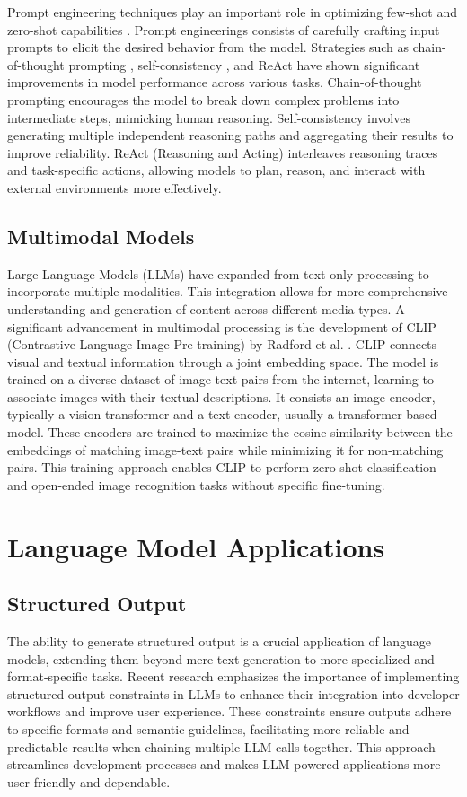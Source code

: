 \documentclass[a4paper, oneside]{discothesis}
\begin{document}
Prompt engineering techniques play an important role in optimizing few-shot and zero-shot capabilities \cite{liu2021pre}. 
Prompt engineerings consists of carefully crafting input prompts to elicit the desired behavior from the model. 
Strategies such as chain-of-thought prompting \cite{wei2022chain}, self-consistency \cite{wang2022self}, and ReAct \cite{yao2023react} have shown significant improvements in model performance across various tasks. Chain-of-thought prompting encourages the model to break down complex problems into intermediate steps, mimicking human reasoning. Self-consistency involves generating multiple independent reasoning paths and aggregating their results to improve reliability. ReAct (Reasoning and Acting) interleaves reasoning traces and task-specific actions, allowing models to plan, reason, and interact with external environments more effectively.


\subsection{Multimodal Models}
Large Language Models (LLMs) have expanded from text-only processing to incorporate multiple modalities. This integration allows for more comprehensive understanding and generation of content across different media types. A significant advancement in multimodal processing is the development of CLIP (Contrastive Language-Image Pre-training) by Radford et al. \cite{radford2021cliplearning}. CLIP connects visual and textual information through a joint embedding space. The model is trained on a diverse dataset of image-text pairs from the internet, learning to associate images with their textual descriptions. It consists an image encoder, typically a vision transformer and a text encoder, usually a transformer-based model. These encoders are trained to maximize the cosine similarity between the embeddings of matching image-text pairs while minimizing it for non-matching pairs. This training approach enables CLIP to perform zero-shot classification and open-ended image recognition tasks without specific fine-tuning.

\section{Language Model Applications}

\subsection{Structured Output}
The ability to generate structured output is a crucial application of language models, extending them beyond mere text generation to more specialized and format-specific tasks. Recent research emphasizes the importance of implementing structured output constraints in LLMs to enhance their integration into developer workflows and improve user experience. These constraints ensure outputs adhere to specific formats and semantic guidelines, facilitating more reliable and predictable results when chaining multiple LLM calls together. This approach streamlines development processes and makes LLM-powered applications more user-friendly and dependable.
\end{document}
